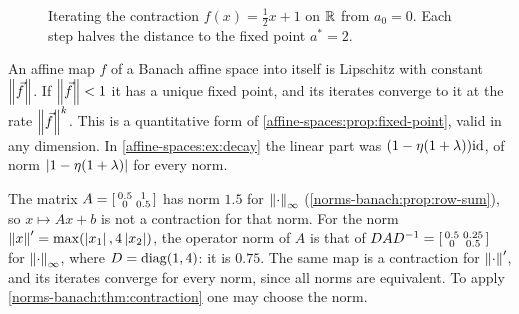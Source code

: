\begin{notechapter}
\begin{figure}[ht]
\centering
{}
\caption{Iterating the contraction $f(x) = \frac12x + 1$ on $\mathbb{R}$ from
$a_0 = 0$. Each step halves the distance to the fixed point $a^* = 2$.}
\label{norms-banach:fig:cobweb}
\end{figure}

\begin{example}\label{norms-banach:ex:affine}
An affine map $f$ of a Banach affine space into itself is Lipschitz with
constant $\left\|\vec{f}\right\|$. If $\left\|\vec{f}\right\| < 1$ it has a unique fixed
point, and its iterates converge to it at the rate
$\left\|\vec{f}\right\|^k$. This is a quantitative form of
\cref{affine-spaces:prop:fixed-point}, valid in any dimension. In
\cref{affine-spaces:ex:decay} the linear part was
$(1 - \eta(1 + \lambda))\mathrm{id}$, of norm $\left|1 - \eta(1 + \lambda)\right|$ for
every norm.
\end{example}

\begin{pitfall}
The matrix $A = \begin{bsmallmatrix}0.5 & 1\\0 & 0.5\end{bsmallmatrix}$
has norm $1.5$ for $\left\|\cdot\right\|_\infty$
(\cref{norms-banach:prop:row-sum}), so $x\mapsto Ax + b$ is not a
contraction for that norm. For the norm
$\left\|x\right\|' = \max(\left|x_1\right|, 4\left|x_2\right|)$, the operator norm of $A$ is that
of $DAD^{-1} = \begin{bsmallmatrix}0.5 & 0.25\\0 & 0.5\end{bsmallmatrix}$
for $\left\|\cdot\right\|_\infty$, where $D = \operatorname{diag}(1, 4)$: it is $0.75$. The same
map is a contraction for $\left\|\cdot\right\|'$, and its iterates converge for
every norm, since all norms are equivalent. To apply
\cref{norms-banach:thm:contraction} one may choose the norm.
\end{pitfall}


\end{notechapter}
